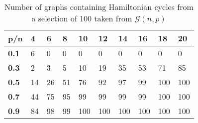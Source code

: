 \documentclass[10pt,a4paper]{report}
\begin{document}

\begin{table}[h]
\centering
\begin{tabular}{|l|l|l|l|l|l|l|l|l|l|}
\hline
\textbf{p/n} & \textbf{4} & \textbf{6} & \textbf{8} & \textbf{10} & \textbf{12} & \textbf{14} & \textbf{16} & \textbf{18} & \textbf{20} \\ \hline
\textbf{0.1} & 6          & 0          & 0          & 0           & 0           & 0           & 0           & 0           & 0           \\ \hline
\textbf{0.3} & 2          & 3          & 5          & 10          & 19          & 35          & 53          & 71          & 85          \\ \hline
\textbf{0.5} & 14         & 26         & 51         & 76          & 92          & 97          & 99          & 100         & 100         \\ \hline
\textbf{0.7} & 44         & 75         & 95         & 99          & 99          & 99          & 99          & 100         & 100         \\ \hline
\textbf{0.9} & 84         & 98         & 99         & 100         & 100         & 100         & 100         & 100         & 100         \\ \hline
\end{tabular}
\caption{Number of graphs containing Hamiltonian cycles from a selection of 100 taken from $
\mathcal{G}(n,p)$}
\label{tab:my-table}
\end{table}
\end{document}
